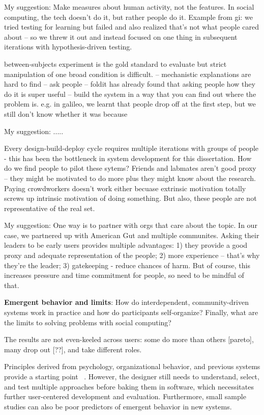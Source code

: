 My suggestion: Make measures about human activity, not the features. In social computing, the tech doesn't do it, but rather people do it. Example from gi: we tried testing for learning but failed and also realized that's not what people cared about -- so we threw it out and instead focused on one thing in subsequent iterations with hypothesis-driven testing. 

between-subjects experiment is the gold standard to evaluate but strict manipulation of one broad condition is difficult. 
-- mechanistic explanations are hard to find
-- ask people -- foldit has already found that asking people how they do it is super useful
-- build the system in a way that you can find out where the problem is. e.g. in galileo, we learnt that people drop off at the first step, but we still don't know whether it was because 

My suggestion: ..... 

Every design-build-deploy cycle requires multiple iterations with groups of people - this has been the bottleneck in system development for this dissertation. How do we find people to pilot these sytems? Friends and labmates aren't good proxy -- they might be motivated to do more plus they might know about the research. Paying crowdworkers doesn't work either becuase extrinsic motivation totally screws up intrinsic motivation of doing something. But also, these people are not representative of the real set.

My suggestion: One way is to partner with orgs that care about the topic. In our case, we partnered up with American Gut and multiple communites. Asking their leaders to be early users provides multiple advantages: 1) they provide a good proxy and adequate representation of the people; 2) more experience -- that's why they're the leader; 3) gatekeeping - reduce chances of harm. But of course, this increases pressure and time commitment for people, so need to be mindful of that. 


\textbf{Emergent behavior and limits}: How do interdependent, community-driven systems work in practice and how do participants self-organize? Finally, what are the limits to solving problems with social computing? 

The results are not even-keeled across users: some do more than others [pareto], many drop out [??], and take different roles.

Principles derived from psychology, organizational behavior, and previous systems provide a starting point ~\cite{fromstatement}. However, the designer still needs to understand, select, and test multiple approaches before baking them in software, which necessitates further user-centered development and evaluation. Furthermore, small sample studies can also be poor predictors of emergent behavior in new systems. 

